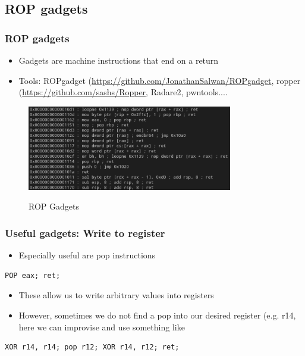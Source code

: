 \documentclass[11pt]{beamer}
\begin{document}
\subsection{ROP gadgets}
\begin{frame}
    \frametitle{ROP gadgets}
    \begin{itemize}
        \item Gadgets are machine instructions that end on a return
        \item Tools: ROPgadget (\url{https://github.com/JonathanSalwan/ROPgadget}\)\), ropper (\url{https://github.com/sashs/Ropper}\)\), Radare2, pwntools....
    \end{itemize}
    \begin{figure}[h]
        \caption{ROP Gadgets}
        \centering
        \includegraphics[width=0.8\textwidth]{./img/gadget.png}\label{gadget}
    \end{figure}

\end{frame}

\begin{frame}[fragile]
    \frametitle{Useful gadgets: Write to register}
    \begin{itemize}
        \item Especially useful are pop instructions
    \end{itemize}
\begin{lstlisting}[style=result]
    POP eax; ret;
\end{lstlisting}
    \begin{itemize}
        \item These allow us to write arbitrary values into registers
        \item However, sometimes we do not find a pop into our desired register (e.g. r14\)\), here we can improvise and use something like
    \end{itemize}
\begin{lstlisting}[style=result]
XOR r14, r14; pop r12; XOR r14, r12; ret;
\end{lstlisting}
\end{frame}
\end{document}
